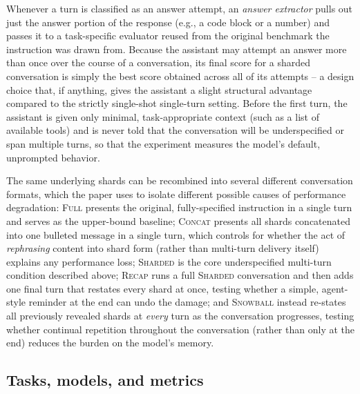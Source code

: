 \documentclass[manuscript,review]{acmart}
\begin{document}
Whenever a turn is classified as an answer attempt, an \emph{answer extractor} pulls out just the answer portion of the response (e.g., a code block or a number) and passes it to a task-specific evaluator reused from the original benchmark the instruction was drawn from. Because the assistant may attempt an answer more than once over the course of a conversation, its final score for a sharded conversation is simply the best score obtained across all of its attempts -- a design choice that, if anything, gives the assistant a slight structural advantage compared to the strictly single-shot single-turn setting. Before the first turn, the assistant is given only minimal, task-appropriate context (such as a list of available tools) and is never told that the conversation will be underspecified or span multiple turns, so that the experiment measures the model's default, unprompted behavior.
 
The same underlying shards can be recombined into several different conversation formats, which the paper uses to isolate different possible causes of performance degradation:
\textsc{Full} presents the original, fully-specified instruction in a single turn and serves as the upper-bound baseline; \textsc{Concat} presents all shards concatenated into one bulleted message in a single turn, which controls for whether the act of \emph{rephrasing} content into shard form (rather than multi-turn delivery itself) explains any performance loss; \textsc{Sharded} is the core underspecified multi-turn condition described above; \textsc{Recap} runs a full \textsc{Sharded} conversation and then adds one final turn that restates every shard at once, testing whether a simple, agent-style reminder at the end can undo the damage; and \textsc{Snowball} instead re-states all previously revealed shards at \emph{every} turn as the conversation progresses, testing whether continual repetition throughout the conversation (rather than only at the end) reduces the burden on the model's memory.


\subsection{Tasks, models, and metrics}
 
\end{document}
